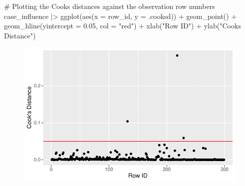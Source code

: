 \documentclass[
  letterpaper,
  DIV=11,
  numbers=noendperiod]{scrartcl}
\newenvironment{Shaded}{\begin{snugshade}}{\end{snugshade}}
\newcommand{\AttributeTok}[1]{\textcolor[rgb]{0.40,0.45,0.13}{#1}}
\newcommand{\CommentTok}[1]{\textcolor[rgb]{0.37,0.37,0.37}{#1}}
\newcommand{\FloatTok}[1]{\textcolor[rgb]{0.68,0.00,0.00}{#1}}
\newcommand{\FunctionTok}[1]{\textcolor[rgb]{0.28,0.35,0.67}{#1}}
\newcommand{\NormalTok}[1]{\textcolor[rgb]{0.00,0.23,0.31}{#1}}
\newcommand{\SpecialCharTok}[1]{\textcolor[rgb]{0.37,0.37,0.37}{#1}}
\newcommand{\StringTok}[1]{\textcolor[rgb]{0.13,0.47,0.30}{#1}}
\begin{document}
\begin{Shaded}
\begin{Highlighting}[]
\CommentTok{\# Plotting the Cook\textquotesingle{}s distances against the observation row numbers}
\NormalTok{case\_influence }\SpecialCharTok{|\textgreater{}}
  \FunctionTok{ggplot}\NormalTok{(}\FunctionTok{aes}\NormalTok{(}\AttributeTok{x =}\NormalTok{ row\_id, }\AttributeTok{y =}\NormalTok{ .cooksd)) }\SpecialCharTok{+}
  \FunctionTok{geom\_point}\NormalTok{() }\SpecialCharTok{+} 
  \FunctionTok{geom\_hline}\NormalTok{(}\AttributeTok{yintercept =} \FloatTok{0.05}\NormalTok{, }\AttributeTok{col =} \StringTok{"red"}\NormalTok{) }\SpecialCharTok{+}
  \FunctionTok{xlab}\NormalTok{(}\StringTok{"Row ID"}\NormalTok{) }\SpecialCharTok{+} \FunctionTok{ylab}\NormalTok{(}\StringTok{"Cook\textquotesingle{}s Distance"}\NormalTok{)}
\end{Highlighting}
\end{Shaded}

\begin{figure}[H]

{\centering \includegraphics{SDS-291-final-project-report_files/figure-pdf/unnamed-chunk-9-3.pdf}

}

\end{figure}
\end{document}
